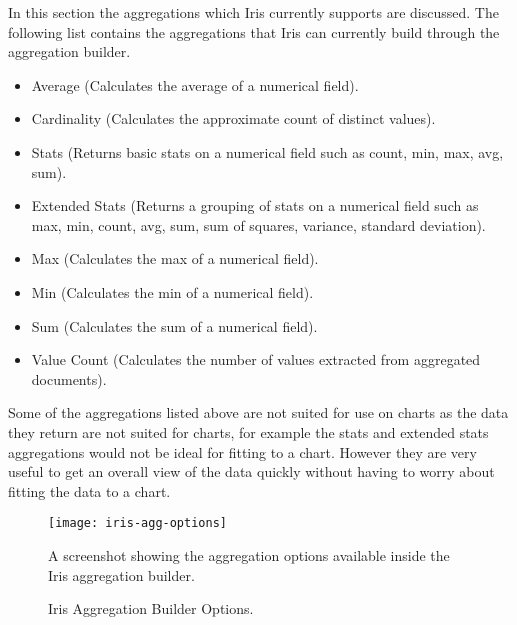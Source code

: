 \documentclass[12pt,a4paper,titlepage]{report}
\begin{document}
In this section the aggregations which Iris currently supports are discussed. The following list contains the aggregations that Iris can currently build through the aggregation builder.
\begin{itemize}
    \item Average (Calculates the average of a numerical field).
    \item Cardinality (Calculates the approximate count of distinct values).
    \item Stats (Returns basic stats on a numerical field such as count, min, max, avg, sum).
    \item Extended Stats (Returns a grouping of stats on a numerical field such as max, min, count, avg, sum, sum of squares, variance, standard deviation).
    \item Max (Calculates the max of a numerical field).
    \item Min (Calculates the min of a numerical field).
    \item Sum (Calculates the sum of a numerical field).
    \item Value Count (Calculates the number of values extracted from aggregated documents).
\end{itemize}  
Some of the aggregations listed above are not suited for use on charts as the data they return are not suited for charts, for example the stats and extended stats aggregations would not be ideal for fitting to a chart. However they are very useful to get an overall view of the data quickly without having to worry about fitting the data to a chart.
\begin{figure}[H]
\begin{tcolorbox}
\begin{center}
\texttt{[image: iris-agg-options]}
\end{center}
A screenshot showing the aggregation options available inside the Iris aggregation builder.
\end{tcolorbox}
\caption{Iris Aggregation Builder Options.}
\end{figure}
\end{document}
